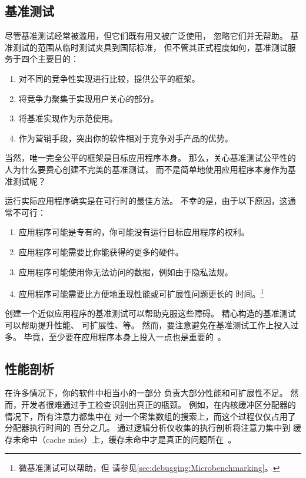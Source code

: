 \subsection{基准测试}
\label{sec:debugging:Benchmarking}

尽管基准测试经常被滥用，但它们既有用又被广泛使用，
忽略它们并无帮助。
基准测试的范围从临时测试夹具到国际标准，
但不管其正式程度如何，基准测试服务于四个主要目的：

\begin{enumerate}
\item	对不同的竞争性实现进行比较，提供公平的框架。
\item	将竞争力聚集于实现用户关心的部分。
\item	将基准实现作为示范使用。
\item	作为营销手段，突出你的软件相对于竞争对手产品的优势。
\end{enumerate}

当然，唯一完全公平的框架是目标应用程序本身。
那么，关心基准测试公平性的人为什么要费心创建不完美的基准测试，
而不是简单地使用应用程序本身作为基准测试呢？

运行实际应用程序确实是在可行时的最佳方法。
不幸的是，由于以下原因，这通常不可行：

\begin{enumerate}
\item	应用程序可能是专有的，你可能没有运行目标应用程序的权利。
\item	应用程序可能需要比你能获得的更多的硬件。
\item	应用程序可能使用你无法访问的数据，例如由于隐私法规。
\item	应用程序可能需要比方便地重现性能或可扩展性问题更长的
	时间。\footnote{
		微基准测试可以帮助，但
		请参见\cref{sec:debugging:Microbenchmarking}。}
\end{enumerate}

创建一个近似应用程序的基准测试可以帮助克服这些障碍。
精心构造的基准测试可以帮助提升性能、
可扩展性、等。
然而，要注意避免在基准测试工作上投入过多。
毕竟，至少要在应用程序本身上投入一点也是重要的~\cite{Gray91}。

\subsection{性能剖析}
\label{sec:debugging:Profiling}

在许多情况下，你的软件中相当小的一部分
负责大部分性能和可扩展性不足。
然而，开发者很难通过手工检查识别出真正的瓶颈。
例如，在内核缓冲区分配器的情况下，所有注意力都集中在
对一个密集数组的搜索上，而这个过程仅仅占用了分配器执行时间的
百分之几。
通过逻辑分析仪收集的执行剖析将注意力集中到
缓存未命中（cache miss）上，缓存未命中才是真正的问题所在~\cite{McKenney93}。


